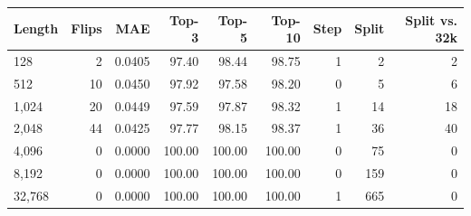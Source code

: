 \begin{tabular}{lrrrrrrrr}
\toprule
Length & Flips & MAE & Top-3 & Top-5 & Top-10 & Step & Split & Split vs. 32k \\
\midrule
128 & 2 & 0.0405 & 97.40 & 98.44 & 98.75 & 1 & 2 & 2 \\
512 & 10 & 0.0450 & 97.92 & 97.58 & 98.20 & 0 & 5 & 6 \\
1,024 & 20 & 0.0449 & 97.59 & 97.87 & 98.32 & 1 & 14 & 18 \\
2,048 & 44 & 0.0425 & 97.77 & 98.15 & 98.37 & 1 & 36 & 40 \\
4,096 & 0 & 0.0000 & 100.00 & 100.00 & 100.00 & 0 & 75 & 0 \\
8,192 & 0 & 0.0000 & 100.00 & 100.00 & 100.00 & 0 & 159 & 0 \\
32,768 & 0 & 0.0000 & 100.00 & 100.00 & 100.00 & 1 & 665 & 0 \\
\bottomrule
\end{tabular}
